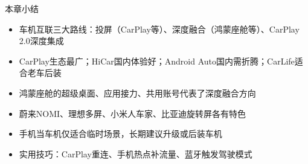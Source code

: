 \begin{tcbsummary}{本章小结}
\begin{itemize}
  \item 车机互联三大路线：投屏（CarPlay等）、深度融合（鸿蒙座舱等）、CarPlay 2.0深度集成
  \item CarPlay生态最广；HiCar国内体验好；Android Auto国内需折腾；CarLife适合老车后装
  \item 鸿蒙座舱的超级桌面、应用接力、共用账号代表了深度融合方向
  \item 蔚来NOMI、理想多屏、小米人车家、比亚迪旋转屏各有特色
  \item 手机当车机仅适合临时场景，长期建议升级或后装车机
  \item 实用技巧：CarPlay重连、手机热点补流量、蓝牙触发驾驶模式
\end{itemize}

\end{tcbsummary}
